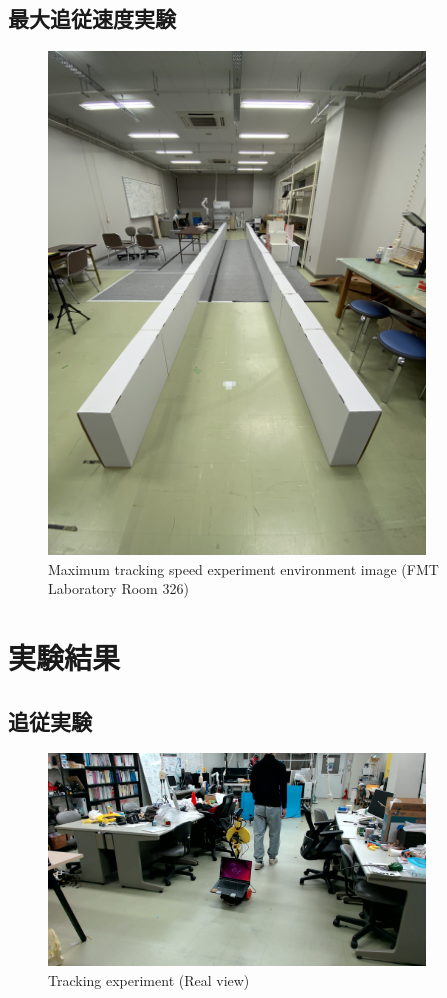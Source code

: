 \subsection{最大追従速度実験}
\begin{figure}[h]
  \begin{center}
  \includegraphics[width=100mm, angle=-90, clip]{figure/experimental_env3.JPG}
  \caption{Maximum tracking speed experiment environment image (FMT Laboratory Room 326)}
  \label{Maximum tracking speed experiment environment image (FMT Laboratory Room 326)}
  \end{center}
\end{figure}

\section{実験結果}
\subsection{追従実験}
\begin{figure}[h]
  \begin{center}
  \includegraphics[width=100mm,clip]{figure/Tracking-experiment-Real-view.jpg}
  \caption{Tracking experiment (Real view)}
  \label{Tracking experiment (Real view)}
  \end{center}
\end{figure}

